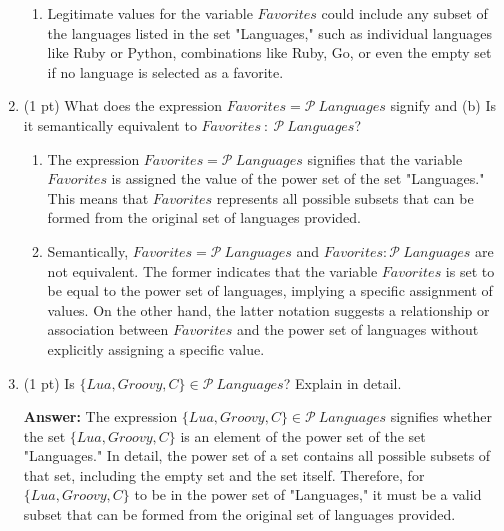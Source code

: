 \documentclass[12pt]{article}
\begin{document}
\begin{spacing}{1.5}
\begin{enumerate}
\begin{enumerate}
		      	\item Legitimate values for the variable $Favorites$ could include any subset of the languages listed in the set "Languages," such as individual languages like Ruby or Python, combinations like {Ruby, Go}, or even the empty set if no language is selected as a favorite.
		      \end{enumerate}
		      		      		      
		\item (1 pt) What does the expression $Favorites = \mathcal{P} \: Languages$ signify and (b) Is it semantically equivalent to $Favorites \: : \: \mathcal{P} \: Languages$?
		      		      		      
		      \begin{enumerate}
		      	\item The expression $Favorites = \mathcal{P} \: Languages$ signifies that the variable $Favorites$ is assigned the value of the power set of the set "Languages." This means that $Favorites$ represents all possible subsets that can be formed from the original set of languages provided. 
		      	      		      	      		      	                      
		      	\item Semantically, $Favorites = \mathcal{P} \: Languages$ and $Favorites : \mathcal{P} \: Languages$ are not equivalent. The former indicates that the variable $Favorites$ is set to be equal to the power set of languages, implying a specific assignment of values. On the other hand, the latter notation suggests a relationship or association between $Favorites$ and the power set of languages without explicitly assigning a specific value.\\
		      \end{enumerate}
		      		      		                  
		\item (1 pt) Is $\{Lua, Groovy, C\} \in \mathcal{P} \: Languages$? Explain in detail.
		      		      		      
		      \textbf{Answer:} The expression $\{Lua, Groovy, C\} \in \mathcal{P} \: Languages$ signifies whether the set $\{Lua, Groovy, C\}$ is an element of the power set of the set "Languages." In detail, the power set of a set contains all possible subsets of that set, including the empty set and the set itself. Therefore, for $\{Lua, Groovy, C\}$ to be in the power set of "Languages," it must be a valid subset that can be formed from the original set of languages provided.\\
		      		      		                  

\end{enumerate}
\end{spacing}
\end{document}
